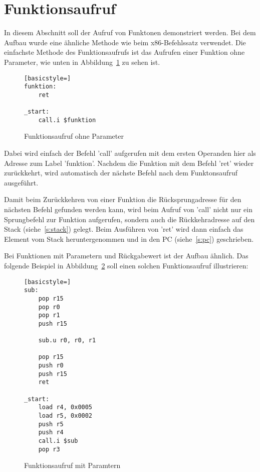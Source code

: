 \section{Funktionsaufruf}
In diesem Abschnitt soll der Aufruf von Funktonen demonstriert werden. Bei dem
Aufbau wurde eine ähnliche Methode wie beim x86-Befehlssatz verwendet. Die
einfachste Methode des Funktionsaufrufs ist das Aufrufen einer Funktion ohne
Parameter, wie unten in Abbildung~\ref{code:function_struct}  zu sehen ist.
\begin{figure}[htb]
\begin{lstlisting}[basicstyle=]
funktion:
	ret

_start:
	call.i $funktion
\end{lstlisting}
\caption{Funktionsaufruf ohne Parameter}
\label{code:function_struct}
\end{figure}
Dabei wird einfach der Befehl 'call' aufgerufen mit dem ersten Operanden hier
als Adresse zum Label 'funktion'. Nachdem die Funktion mit dem Befehl 'ret'
wieder zurückkehrt, wird automatisch der nächste Befehl nach dem Funktonsaufruf
ausgeführt.

Damit beim Zurückkehren von einer Funktion die Rücksprungadresse für den
nächsten Befehl gefunden werden kann, wird beim Aufruf von 'call' nicht nur ein
Sprungbefehl zur Funktion aufgerufen, sondern auch die Rückkehradresse auf den
Stack (siehe~\ref{s:stack}) gelegt. Beim Ausführen von 'ret' wird dann einfach
das Element vom Stack heruntergenommen und in den PC (siehe~\ref{s:pc})
geschrieben.

Bei Funktionen mit Parametern und Rückgabewert ist der Aufbau ähnlich. Das
folgende Beispiel in Abbildung~\ref{code:function_parameter} soll einen solchen
Funktionsaufruf illustrieren:
\begin{figure}[!htb]
\begin{lstlisting}[basicstyle=]
sub:
	pop r15
	pop r0
	pop r1
	push r15

	sub.u r0, r0, r1

	pop r15
	push r0
	push r15
	ret

_start:
	load r4, 0x0005
	load r5, 0x0002
	push r5
	push r4
	call.i $sub
	pop r3
\end{lstlisting}
\caption{Funktionsaufruf mit Paramtern}
\label{code:function_parameter}
\end{figure}


